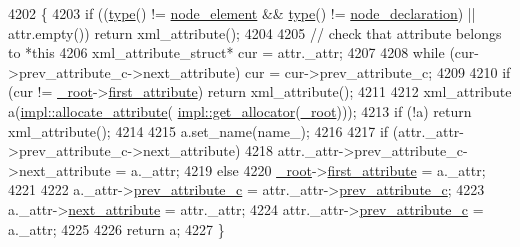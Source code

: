 \begin{DoxyCode}
4202     \{
4203         \textcolor{keywordflow}{if} ((\hyperlink{classpugi_1_1xml__node_ab881e8c41edc84bf7507591d1ad8ead4}{type}() != \hyperlink{namespacepugi_a137e94a038e4ab0ada6477cf7f6153a9a6d223e3a0d8ce8e4ee6f4a2697b8bcd1}{node\_element} && \hyperlink{classpugi_1_1xml__node_ab881e8c41edc84bf7507591d1ad8ead4}{type}() != 
      \hyperlink{namespacepugi_a137e94a038e4ab0ada6477cf7f6153a9aad8024cc4a4afbc68c871f3826a00616}{node\_declaration}) || attr.empty()) \textcolor{keywordflow}{return} xml\_attribute();
4204         
4205         \textcolor{comment}{// check that attribute belongs to *this}
4206         xml\_attribute\_struct* cur = attr.\_attr;
4207 
4208         \textcolor{keywordflow}{while} (cur->prev\_attribute\_c->next\_attribute) cur = cur->prev\_attribute\_c;
4209 
4210         \textcolor{keywordflow}{if} (cur != \hyperlink{classpugi_1_1xml__node_a45a5b342de1e37a60565f7693f03cc08}{\_root}->\hyperlink{structpugi_1_1xml__node__struct_a482d2daf97ce0745661cb2c57d8f6fb3}{first\_attribute}) \textcolor{keywordflow}{return} xml\_attribute();
4211 
4212         xml\_attribute a(\hyperlink{pugixml_8cpp_aa5c147125f246a331c4a30df8e096960}{impl::allocate\_attribute}(
      \hyperlink{pugixml_8cpp_ab194763af6dca2d07ad5139dc2a75f60}{impl::get\_allocator}(\hyperlink{classpugi_1_1xml__node_a45a5b342de1e37a60565f7693f03cc08}{\_root})));
4213         \textcolor{keywordflow}{if} (!a) \textcolor{keywordflow}{return} xml\_attribute();
4214 
4215         a.set\_name(name\_);
4216 
4217         \textcolor{keywordflow}{if} (attr.\_attr->prev\_attribute\_c->next\_attribute)
4218             attr.\_attr->prev\_attribute\_c->next\_attribute = a.\_attr;
4219         \textcolor{keywordflow}{else}
4220             \hyperlink{classpugi_1_1xml__node_a45a5b342de1e37a60565f7693f03cc08}{\_root}->\hyperlink{structpugi_1_1xml__node__struct_a482d2daf97ce0745661cb2c57d8f6fb3}{first\_attribute} = a.\_attr;
4221         
4222         a.\_attr->\hyperlink{structpugi_1_1xml__attribute__struct_a0e3a022235b316e4cfc1034ceb7d7862}{prev\_attribute\_c} = attr.\_attr->\hyperlink{structpugi_1_1xml__attribute__struct_a0e3a022235b316e4cfc1034ceb7d7862}{prev\_attribute\_c};
4223         a.\_attr->\hyperlink{structpugi_1_1xml__attribute__struct_a9860c0eb7fa72dc9b69ee9b0575f9efc}{next\_attribute} = attr.\_attr;
4224         attr.\_attr->\hyperlink{structpugi_1_1xml__attribute__struct_a0e3a022235b316e4cfc1034ceb7d7862}{prev\_attribute\_c} = a.\_attr;
4225                 
4226         \textcolor{keywordflow}{return} a;
4227     \}
\end{DoxyCode}
